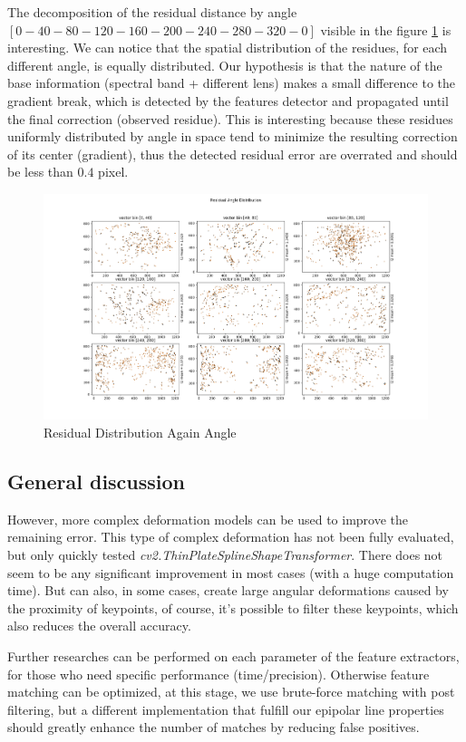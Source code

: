 \documentclass[]{elsarticle}
\begin{document}
	
	The decomposition of the residual distance by angle $[0-40-80-120-160-200-240-280-320-0]$ visible in the figure \ref{fig:residual-angle} is interesting.
	We can notice that the spatial distribution of the residues, for each different angle, is equally distributed.
	Our hypothesis is that the nature of the base information (spectral band + different lens) makes a small difference to the gradient break,
	which is detected by the features detector and propagated until the final correction (observed residue).
	This is interesting because these residues uniformly distributed by angle in space tend to minimize the resulting correction of its center (gradient),
	thus the detected residual error are overrated and should be less than $0.4$ pixel.
	\\
	
	\begin{figure}[!htb]
		\centering
		\includegraphics[width=\linewidth]{../figures/perspective-features-residual.png}
		\caption{Residual Distribution Again Angle}
		\label{fig:residual-angle}
	\end{figure}

	\subsection{General discussion}
	
	\par However, more complex deformation models \cite{Lombaert, ThinPlateSpline} can be used to improve the remaining error.
	This type of complex deformation has not been fully evaluated, but only quickly tested \textit{cv2.ThinPlateSplineShapeTransformer}.
	There does not seem to be any significant improvement in most cases (with a huge computation time).
	But can also, in some cases, create large angular deformations caused by the proximity of keypoints,
	of course, it's possible to filter these keypoints, which also reduces the overall accuracy.
	\\
	\par Further researches can be performed on each parameter of the feature extractors, for those who need specific performance (time/precision).
	Otherwise feature matching can be optimized, at this stage, we use brute-force matching with post filtering,
	but a different implementation that fulfill our epipolar line properties should greatly enhance the number of matches by reducing false positives.
	
\end{document}
